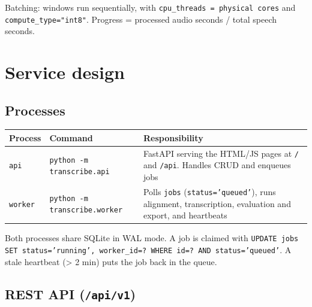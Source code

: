 \documentclass[11pt]{article}
\begin{document}
Batching: windows run sequentially, with \texttt{cpu\_\allowbreak{}threads =\allowbreak{} physical cores} and \texttt{compute\_\allowbreak{}type=\allowbreak{}"int8"}. Progress = processed audio seconds / total speech seconds.

\hypertarget{service-design}{%
\section{Service design}\label{service-design}}

\hypertarget{processes}{%
\subsection{Processes}\label{processes}}

\begin{longtable}[]{@{}>{\raggedright\arraybackslash}p{}>{\raggedright\arraybackslash}p{}>{\raggedright\arraybackslash}p{}@{}}
\toprule\noalign{}
Process & Command & Responsibility \\
\midrule\noalign{}
\endhead
\bottomrule\noalign{}
\endlastfoot
\texttt{api} & \texttt{python -\allowbreak{}m transcribe.\allowbreak{}api} & FastAPI serving the HTML/JS pages at \texttt{/\allowbreak{}} and \texttt{/api}. Handles CRUD and enqueues jobs \\
\texttt{worker} & \texttt{python -\allowbreak{}m transcribe.\allowbreak{}worker} & Polls \texttt{jobs} (\texttt{status=\allowbreak{}'queued'}), runs alignment, transcription, evaluation and export, and heartbeats \\
\end{longtable}

Both processes share SQLite in WAL mode. A job is claimed with \texttt{UPDATE jobs SET status=\allowbreak{}'running',\allowbreak{} worker\_\allowbreak{}id=\allowbreak{}? WHERE id=\allowbreak{}? AND status=\allowbreak{}'queued'}. A stale heartbeat (\textgreater{} 2 min) puts the job back in the queue.

\hypertarget{rest-api-apiv1}{%
\subsection{\texorpdfstring{REST API (\texttt{/api/v1})}{REST API (/api/v1)}}\label{rest-api-apiv1}}
\end{document}
